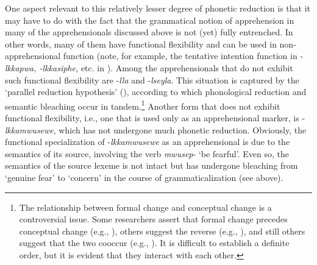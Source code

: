 \documentclass[output=paper,colorlinks,citecolor=brown]{langscibook}
\begin{document}
One aspect relevant to this relatively lesser degree of phonetic reduction is that it may have to do with the fact that the grammatical notion of apprehension in many of the apprehensionals discussed above is not (yet) fully entrenched. In other words, many of them have functional flexibility and can be used in non-apprehensional function (note, for example, the tentative intention function in \nobreakdash-\textit{lkkapwa, -lkkasiphe,} etc. in ). Among the apprehensionals that do not exhibit such functional flexibility are \nobreakdash-\textit{lla} and \nobreakdash-\textit{lseyla}. This situation is captured by the `parallel reduction hypothesis' (\citealt[19--21]{bybeeetal1994}), according to which phonological reduction and semantic bleaching occur in tandem.\footnote{The relationship between formal change and conceptual change is a controversial issue. Some researchers assert that formal change precedes conceptual change (e.g., \citealt{Lightfoot1989,Lightfoot1991}), others suggest the reverse (e.g., \citealt{Sapir1921,Givón1975,HeineEtAl1991,Heine1993}), and still others suggest that the two cooccur (e.g., \citealt{HopperTraugott2003,bybeeetal1994}). It is difficult to establish a definite order, but it is evident that they interact with each other.} Another form that does not exhibit functional flexibility, i.e., one that is used only as an apprehensional marker, is \nobreakdash-\textit{lkkamwusewe}, which has not undergone much phonetic reduction. Obviously, the functional specialization of \nobreakdash-\textit{lkkamwusewe} as an apprehensional is due to the semantics of its source, involving the verb \textit{mwusep}- `be fearful'. Even so, the semantics of the source lexeme is not intact but has undergone bleaching from `genuine fear' to `concern' in the course of grammaticalization (see  above). 
\end{document}
